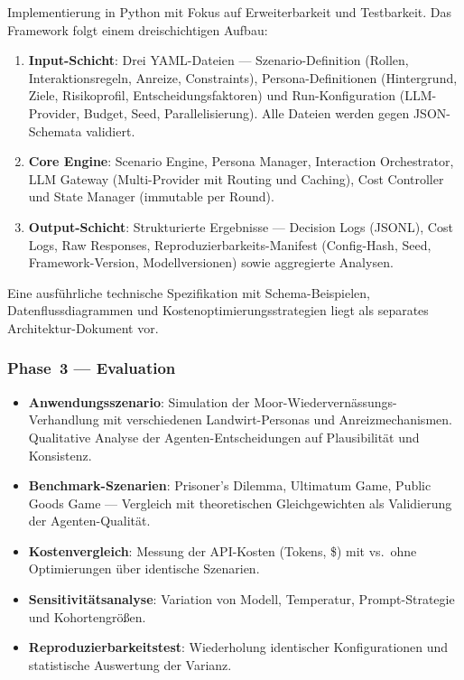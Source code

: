 \documentclass[12pt, a4paper]{article}
\begin{document}
Implementierung in Python mit Fokus auf Erweiterbarkeit und Testbarkeit. Das Framework folgt einem dreischichtigen Aufbau:

\begin{enumerate}
    \item \textbf{Input-Schicht}: Drei YAML-Dateien --- Szenario-Definition (Rollen, Interaktionsregeln, Anreize, Constraints), Persona-Definitionen (Hintergrund, Ziele, Risikoprofil, Entscheidungsfaktoren) und Run-Konfiguration (LLM-Provider, Budget, Seed, Parallelisierung). Alle Dateien werden gegen JSON-Schemata validiert.
    \item \textbf{Core Engine}: Scenario Engine, Persona Manager, Interaction Orchestrator, LLM Gateway (Multi-Provider mit Routing und Caching), Cost Controller und State Manager (immutable per Round).
    \item \textbf{Output-Schicht}: Strukturierte Ergebnisse --- Decision Logs (JSONL), Cost Logs, Raw Responses, Reproduzierbarkeits-Manifest (Config-Hash, Seed, Framework-Version, Modellversionen) sowie aggregierte Analysen.
\end{enumerate}

Eine ausführliche technische Spezifikation mit Schema-Beispielen, Datenflussdiagrammen und Kostenoptimierungsstrategien liegt als separates Architektur-Dokument vor.

\subsubsection*{Phase~3 --- Evaluation}
\begin{itemize}
    \item \textbf{Anwendungsszenario}: Simulation der Moor-Wiedervernässungs-Verhandlung mit verschiedenen Landwirt-Personas und Anreizmechanismen. Qualitative Analyse der Agenten-Entscheidungen auf Plausibilität und Konsistenz.
    \item \textbf{Benchmark-Szenarien}: Prisoner's Dilemma, Ultimatum Game, Public Goods Game --- Vergleich mit theoretischen Gleichgewichten als Validierung der Agenten-Qualität.
    \item \textbf{Kostenvergleich}: Messung der API-Kosten (Tokens, \$) mit vs.\ ohne Optimierungen über identische Szenarien.
    \item \textbf{Sensitivitätsanalyse}: Variation von Modell, Temperatur, Prompt-Strategie und Kohortengrößen.
    \item \textbf{Reproduzierbarkeitstest}: Wiederholung identischer Konfigurationen und statistische Auswertung der Varianz.
\end{itemize}
\end{document}
